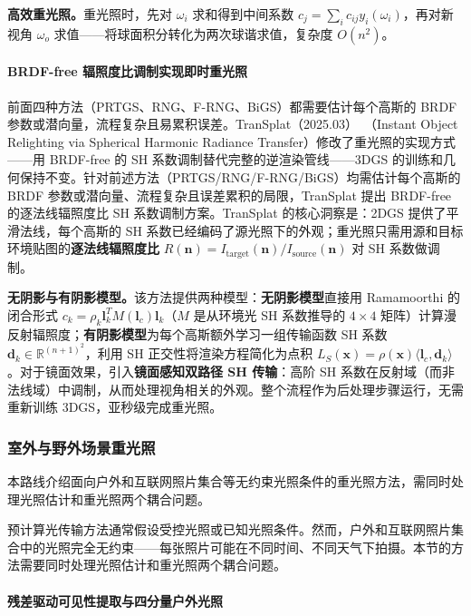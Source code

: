 \textbf{高效重光照。}重光照时，先对 $\omega_i$ 求和得到中间系数 $c_j = \sum_{i} c_{ij} y_i(\omega_i)$，再对新视角 $\omega_o$ 求值——将球面积分转化为两次球谐求值，复杂度 $O(n^2)$。

\paragraph{BRDF-free 辐照度比调制实现即时重光照}

前面四种方法（PRTGS、RNG、F-RNG、BiGS）都需要估计每个高斯的 BRDF 参数或潜向量，流程复杂且易累积误差。TranSplat（2025.03）~\cite{2503_22676}（Instant Object Relighting via Spherical Harmonic Radiance Transfer）修改了重光照的实现方式——用 BRDF-free 的 SH 系数调制替代完整的逆渲染管线——3DGS 的训练和几何保持不变。针对前述方法（PRTGS/RNG/F-RNG/BiGS）均需估计每个高斯的 BRDF 参数或潜向量、流程复杂且误差累积的局限，TranSplat 提出 BRDF-free 的逐法线辐照度比 SH 系数调制方案。TranSplat 的核心洞察是：2DGS 提供了平滑法线，每个高斯的 SH 系数已经编码了源光照下的外观；重光照只需用源和目标环境贴图的\textbf{逐法线辐照度比} $R(\mathbf{n}) = I_{\text{target}}(\mathbf{n}) / I_{\text{source}}(\mathbf{n})$ 对 SH 系数做调制。

\textbf{无阴影与有阴影模型。}该方法提供两种模型：\textbf{无阴影模型}直接用 Ramamoorthi 的闭合形式 $c_k = \rho_k \mathbf{l}_k^T M(\mathbf{l}_c) \mathbf{l}_k$（$M$ 是从环境光 SH 系数推导的 $4 \times 4$ 矩阵）计算漫反射辐照度；\textbf{有阴影模型}为每个高斯额外学习一组传输函数 SH 系数 $\mathbf{d}_k \in \mathbb{R}^{(n+1)^2}$，利用 SH 正交性将渲染方程简化为点积 $L_S(\mathbf{x}) = \rho(\mathbf{x}) \langle \mathbf{l}_c, \mathbf{d}_k \rangle$。对于镜面效果，引入\textbf{镜面感知双路径 SH 传输}：高阶 SH 系数在反射域（而非法线域）中调制，从而处理视角相关的外观。整个流程作为后处理步骤运行，无需重新训练 3DGS，亚秒级完成重光照。

\subsubsection{室外与野外场景重光照}

本路线介绍面向户外和互联网照片集合等无约束光照条件的重光照方法，需同时处理光照估计和重光照两个耦合问题。

预计算光传输方法通常假设受控光照或已知光照条件。然而，户外和互联网照片集合中的光照完全无约束——每张照片可能在不同时间、不同天气下拍摄。本节的方法需要同时处理光照估计和重光照两个耦合问题。

\paragraph{残差驱动可见性提取与四分量户外光照}

